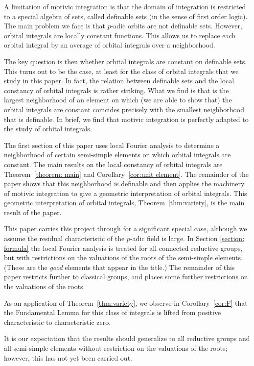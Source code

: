\documentclass[11pt]{amsart}
\theoremstyle{definition}
\theoremstyle{remark}
\numberwithin{equation}{theorem}
\begin{document}
A limitation of motivic integration is that the domain of
integration is restricted to a special algebra of sets, called
definable sets (in the sense of first order logic). The main
problem we face is that $p$-adic orbits are not definable sets.
However, orbital integrals are locally constant functions. This
allows us to replace each orbital integral by an average of
orbital integrals over a neighborhood.

The key question is then whether orbital integrals are constant on
definable sets. This turns out to be the case, at least for the
class of orbital integrals that we study in this paper. In fact,
the relation between definable sets and the local constancy of
orbital integrals is rather striking.  What we find is that is the
largest neighborhood of an element on which (we are able to show
that) the orbital integrals are constant coincides precisely with
the smallest neighborhood that is definable.  In brief, we find
that motivic integration is perfectly adapted to the study of
orbital integrals.

The first section of this paper uses local Fourier analysis to
determine a neighborhood of certain semi-simple elements on which
orbital integrals are constant. The main results on the local
constancy of orbital integrals are Theorem~\ref{theorem: main} and
Corollary~\ref{cor:unit element}. The remainder of the paper shows
that this neighborhood is definable and then applies the machinery
of motivic integration to give a geometric interpretation of
orbital integrals. This geometric interpretation of orbital
integrals, Theorem~\ref{thm:variety}, is the main result of the
paper.


This paper carries this project through for a significant special
case, although we assume the residual characteristic of the
$p$-adic field is large. In Section \ref{section: formula} the
local Fourier analysis is treated for all connected reductive
groups, but with restrictions on the valuations of the roots of
the semi-simple elements. (These are the {\it good\/} elements
that appear in the title.) The remainder of this paper restricts
further to classical groups, and places some further restrictions
on the valuations of the roots.

As an application of Theorem~\ref{thm:variety}, we observe in
Corollary~\ref{cor:F} that the Fundamental Lemma for this class of
integrals is lifted from positive characteristic to characteristic
zero.

It is our expectation that the results should generalize to all
reductive groups and all semi-simple elements without restriction
on the valuations of the roots; however, this has not yet been
carried out.
\end{document}
